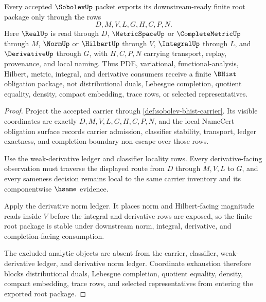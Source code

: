\begin{theorem}
\label{thm:sobolev-finite-window-root-package}
Every accepted $\SobolevUp$ packet exports its downstream-ready finite root package only through the rows
$$
D,M,V,L,G,H,C,P,N .
$$
Here $\RealUp$ is read through $D$, $\MetricSpaceUp$ or $\CompleteMetricUp$ through $M$, $\NormUp$ or $\HilbertUp$ through $V$, $\IntegralUp$ through $L$, and $\DerivativeUp$ through $G$, with $H,C,P,N$ carrying transport, replay, provenance, and local naming. Thus PDE, variational, functional-analysis, Hilbert, metric, integral, and derivative consumers receive a finite $\BHist$ obligation package, not distributional duals, Lebesgue completion, quotient equality, density, compact embedding, trace rows, or selected representatives.
\end{theorem}
\begin{proof}
Project the accepted carrier through \autoref{def:sobolev-bhist-carrier}. Its visible coordinates are exactly $D,M,V,L,G,H,C,P,N$, and the local NameCert obligation surface records carrier admission, classifier stability, transport, ledger exactness, and completion-boundary non-escape over those rows.

Use the weak-derivative ledger and classifier locality rows. Every derivative-facing observation must traverse the displayed route from $D$ through $M,V,L$ to $G$, and every sameness decision remains local to the same carrier inventory and its componentwise $\hsame$ evidence.

Apply the derivative norm ledger. It places norm and Hilbert-facing magnitude reads inside $V$ before the integral and derivative rows are exposed, so the finite root package is stable under downstream norm, integral, derivative, and completion-facing consumption.

The excluded analytic objects are absent from the carrier, classifier, weak-derivative ledger, and derivative norm ledger. Coordinate exhaustion therefore blocks distributional duals, Lebesgue completion, quotient equality, density, compact embedding, trace rows, and selected representatives from entering the exported root package.
\end{proof}

